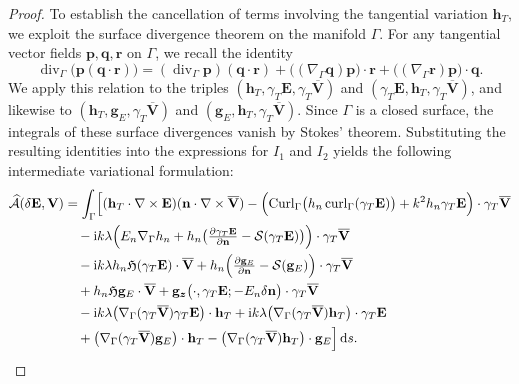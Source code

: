 \documentclass[12pt,reqno]{amsart}
\theoremstyle{definition}
\numberwithin{equation}{section}
\begin{document}
\begin{proof}
To establish the cancellation of terms involving the tangential variation $\mathbf{h}_T$, we exploit the surface divergence theorem on the manifold $\Gamma$. For any tangential vector fields $\mathbf{p}, \mathbf{q}, \mathbf{r}$ on $\Gamma$, we recall the identity
\[
\operatorname{div}_\Gamma\bigl(\mathbf{p}(\mathbf{q}\cdot\mathbf{r})\bigr) = (\operatorname{div}_\Gamma\mathbf{p})(\mathbf{q}\cdot\mathbf{r}) + \bigl((\nabla_\Gamma\mathbf{q})\mathbf{p}\bigr)\cdot\mathbf{r} + \bigl((\nabla_\Gamma\mathbf{r})\mathbf{p}\bigr)\cdot\mathbf{q}.
\]
We apply this relation to the triples $(\mathbf{h}_T, \gamma_T\mathbf{E}, \gamma_T\overline{\mathbf{V}})$ and $(\gamma_T\mathbf{E}, \mathbf{h}_T, \gamma_T\overline{\mathbf{V}})$, and likewise to $(\mathbf{h}_T, \mathbf{g}_E, \gamma_T\overline{\mathbf{V}})$ and $(\mathbf{g}_E, \mathbf{h}_T, \gamma_T\overline{\mathbf{V}})$. Since $\Gamma$ is a closed surface, the integrals of these surface divergences vanish by Stokes' theorem. Substituting the resulting identities into the expressions for $I_1$ and $I_2$ yields the following intermediate variational formulation:
\begin{equation}\label{eg:shape}
\begin{aligned}
\widehat{\mathcal{A}}(\delta\mathbf{E}, \mathbf{V}) &= \int_\Gamma \Bigl[ (\mathbf{h}_T \cdot \nabla \times \mathbf{E}) (\mathbf{n} \cdot \nabla \times \overline{\mathbf{V}}) - \Bigl( \operatorname{Curl}_\Gamma \bigl( h_n \operatorname{curl}_\Gamma(\gamma_T\mathbf{E}) \bigr) + k^2 h_n \gamma_T\mathbf{E} \Bigr) \cdot \gamma_T\overline{\mathbf{V}} \\
&\quad -\mathrm{i}k\lambda \Bigl( E_n \nabla_\Gamma h_n + h_n \bigl( \tfrac{\partial\gamma_T\mathbf{E}}{\partial\mathbf{n}} - \mathcal{S}(\gamma_T\mathbf{E}) \bigr) \Bigr) \cdot \gamma_T\overline{\mathbf{V}} \\
&\quad - \mathrm{i}k\lambda h_n \mathfrak{H} (\gamma_T\mathbf{E}) \cdot \overline{\mathbf{V}} + h_n \Bigl( \tfrac{\partial\mathbf{g}_E}{\partial\mathbf{n}} - \mathcal{S}(\mathbf{g}_E) \Bigr) \cdot \gamma_T\overline{\mathbf{V}} \\
&\quad + h_n \mathfrak{H} \mathbf{g}_E \cdot \overline{\mathbf{V}} + \mathbf{g}_{\boldsymbol{z}} \bigl(\cdot, \gamma_T\mathbf{E}; -E_n \delta\mathbf{n}\bigr) \cdot \gamma_T\overline{\mathbf{V}} \\
&\quad - \mathrm{i}k\lambda \bigl( \nabla_\Gamma(\gamma_T\overline{\mathbf{V}}) \gamma_T\mathbf{E} \bigr) \cdot \mathbf{h}_T + \mathrm{i}k\lambda \bigl( \nabla_\Gamma(\gamma_T\overline{\mathbf{V}}) \mathbf{h}_T \bigr) \cdot \gamma_T\mathbf{E} \\
&\quad +\bigl( \nabla_\Gamma(\gamma_T\overline{\mathbf{V}}) \mathbf{g}_E \bigr) \cdot \mathbf{h}_T - \bigl( \nabla_\Gamma(\gamma_T\overline{\mathbf{V}}) \mathbf{h}_T \bigr) \cdot \mathbf{g}_E \Bigr] \, \mathrm{d}s.
\end{aligned}
\end{equation}



\end{proof}
\end{document}
